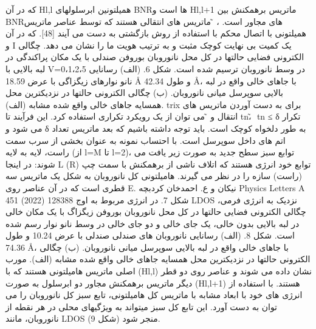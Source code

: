 که در آن Hl,l همیلتونین ابرسلولهای BNRها است و Hl,l+1 ماتریس برهمکنش بین BNRهای مجاور است. ، ̃ ماتریس های انتقالی هستند که توسط عناصر ماتریس همیلتونی با اتصال محکم با استفاده از روش بازگشتی به دست می آیند [48].
که در آن و I یک کمیت بی نهایت کوچک مثبت و به ترتیب هویت ما را نشان می دهد. چگالی الکترونی فضایی حالتها در کل محل نانوروبان بوروفن صندلی با یک مکان پراکندگی در لبه بالایی با V=0،1،2،5 در وسط نانوروبان ترسیم شده است. شکل 6. (الف) رسانایی نانو نوارهای زیگزاگی با عرض 18.59 Å و طول 42.34 Å، با جاهای خالی واقع در لبه بالایی سوپرسل میانی نانوروبان. (ب) چگالی الکترونی حالتها در نزدیکترین محل همسایه جاهای خالی واقع شده مشابه (الف). trix برای به دست آوردن ماتریس های انتقال و ̃ می توان از یک رویکرد تکراری استفاده کرد.
این فرآیند تا tn، ̃ tn ≤ δ تکرار می شود و δ به طور دلخواه کوچک است. باید توجه داشته باشیم که بعد ماتریس تعداد اتم های داخل سوپرسل است. با احتساب نمونه به عنوان بخشی از سرب سمت راست، لایه به لایه (از l=M تا l=2)، توابع سبز سطح جدید به صورت زیر یافت می شوند:
در اینجا L (R) توابع خود انرژی هستند که اتلاف ناشی از برهمکنش با سمت چپ (راست) سازه را در نظر می گیرند. هامیلتونی کل نانوروبان به شکل یک ماتریس سه قطری است که در آن عناصر روی E. نیکان و ع. احمدخان کردبچه Physics Letters A 451 (2022) 128388 شکل 7. در انرژی مربوط به اوج LDOS نزدیک به انرژی فرمی، چگالی الکترونی فضایی حالتها در کل محل نانوروبان بوروفن زیگزاگ با یک مکان خالی در لبه بالایی بدون خالی، یک جای خالی و دو جای خالی در وسط نانو نوار رسم شده است. شکل 8. (الف) رسانایی نانوروبان های صندلی صندلی با عرض 10.24 و طول 74.36 Å، با جاهای خالی واقع در لبه بالایی سوپرسل میانی نانوروبان. (ب) چگالی الکترونی حالتها در نزدیکترین محل همسایه جاهای خالی واقع شده مشابه (الف). مورب اصلی ماتریس هامیلتونی هستند که با (Hl,l) نشان داده می شوند و عناصر روی دو قطر دیگر ماتریس برهمکنش مجاور دو ابرسلول به صورت (Hl,l+1) هستند. با استفاده از انرژی های خود با ابعاد مشابه با ماتریس کل هامیلتونی، تابع سبز کل نانوروبان را می توان به دست آورد. این تابع کل سبز میتواند به ویژگیهای محلی در هر نقطه از نانوروبان، مانند LDOS منجر شود (شکل 9).

